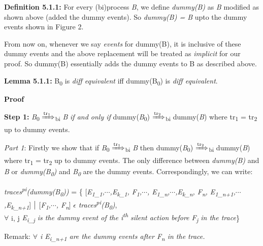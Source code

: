 \documentclass[11pt]{article}
\begin{document}
\vspace{14pt}

{\bf Definition 5.1.1: }For every (bi)process {\it B}, we define {\it dummy(B)} as {\it B} modified as shown above (added the dummy events). So {\it dummy(B) = B} upto the dummy events shown in Figure 2. \newline

From now on, whenever we say {\it events} for dummy(B), it is inclusive of these dummy events and the above replacement will be treated as {\it implicit} for our proof. So dummy(B) essentially adds the dummy events to B as described above.\newline

{\bf Lemma 5.1.1: }B\textsubscript{0} is {\it diff equivalent} iff dummy(B\textsubscript{0}) is {\it diff equivalent}.\newline

{\bf Proof } \newline

{\bf Step 1: }{\it B}\textsubscript{0} {$\xRightarrow[\text{}]{\text{tr\textsubscript{1}}}$}\textsubscript{bi} {\it B} {\it if and only if} dummy({\it B}\textsubscript{0}) {$\xRightarrow[\text{}]{\text{tr\textsubscript{2}}}$}\textsubscript{bi} dummy({\it B}) where tr\textsubscript{1} = tr\textsubscript{2} up to dummy events.

{\it Part 1}: Firstly we show that if {\it B}\textsubscript{0} {$\xRightarrow[\text{}]{\text{tr\textsubscript{1}}}$}\textsubscript{bi} {\it B} then dummy({\it B}\textsubscript{0}) {$\xRightarrow[\text{}]{\text{tr\textsubscript{2}}}$}\textsubscript{bi} dummy({\it B}) where tr\textsubscript{1} = tr\textsubscript{2} up to dummy events.\newline
\hspace*{14pt}The only difference between {\it dummy(B)} and {\it B} or {\it dummy(B\textsubscript{0})} and {\it B\textsubscript{0}} are the dummy events. Correspondingly, we can write:
\begin{center}
    {\it traces\textsuperscript{pi}(dummy(B\textsubscript{0}))} = \{ [{\it E\textsubscript{1\_1},$\cdots$,E\textsubscript{k\_1}, F\textsubscript{1},$\cdots$, E\textsubscript{1\_n},$\cdots$,E\textsubscript{k\_n}, F\textsubscript{n}, E\textsubscript{1\_n+1},$\cdots$,E\textsubscript{k\_n+1}}] $\bigm|$ [{\it F\textsubscript{1},$\cdots$, F\textsubscript{n}}] $\epsilon$ {\it traces\textsuperscript{pi}(B\textsubscript{0})},\\$\forall$ i, j {\it E\textsubscript{i\_j} is the dummy event of the i\textsuperscript{th} silent action before F\textsubscript{j} in the trace}\}\\
\end{center}
Remark: {\it $\forall$ i E\textsubscript{i\_n+1} are the dummy events after F\textsubscript{n} in the trace.}\newline
\end{document}
